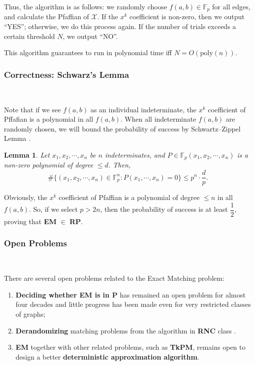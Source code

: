 \documentclass[11pt]{article}
\theoremstyle{plain}
\newtheorem{lemma}{Lemma}[section]
\begin{document}
Thus, the algorithm is as follows: we randomly choose $f(a,b)\in \mathbb{F}_p$ for all edges, and calculate the Pfaffian of $\mathcal{X}$. If the $x^k$ coefficient is non-zero, then we output ``YES''; otherwise, we do this process again. If the number of trials exceeds a certain threshold $N$, we output ``NO''.

This algorithm guarantees to run in polynomial time iff $N=O(\text{poly}(n))$.

\subsubsection{Correctness: Schwarz's Lemma}\

Note that if we see $f(a,b)$ as an individual indeterminate, the $x^k$ coefficient of Pffafian is a polynomial in all $f(a,b)$. When all indeterminate $f(a,b)$ are randomly chosen, we will bound the probability of success by Schwartz–Zippel Lemma \cite{10.1145/322217.322225}.

\begin{lemma}
\label{schwarz}
Let $x_1,x_2,\cdots,x_n$ be $n$ indeterminates, and $P\in \mathbb{F}_p(x_1,x_2,\cdots,x_n)$ is a non-zero polynomial of degree $\le d$. Then,
$$\#\{(x_1,x_2,\cdots,x_n)\in \mathbb{F}_p^n:P(x_1,\cdots,x_n)=0\}\le p^n\cdot \dfrac{d}{p}.$$
\end{lemma}

Obviously, the $x^k$ coefficient of Pfaffian is a polynomial of degree $\le n$ in all $f(a,b)$. So, if we select $p>2n$, then the probability of success is at least $\dfrac{1}{2}$, proving that \textbf{EM} $\in$ \textbf{RP}.

\subsubsection{Open Problems}\

There are several open problems related to the Exact Matching problem: 
\begin{enumerate}
    \item \textbf{Deciding whether EM is in P} has remained an open problem for almost four decades and little progress has been made even for very restricted classes of graphs;
    \item \textbf{Derandomizing} matching problems from the algorithm in \textbf{RNC} class \cite{svensson2017matching}.
    \item \textbf{EM} together with other related problems, such as \textbf{TkPM}, remains open to design a better \textbf{deterministic approximation algorithm}.
\end{enumerate}
\end{document}
